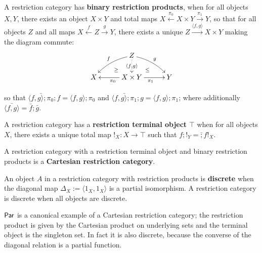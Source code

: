 \begin{definition}\cite{restiii}
A restriction category has {\bf binary restriction products}, when for all objects  $X,Y$, there exists an object $X\times Y$ and total maps $X \xleftarrow{\pi_0}  X\times Y \xrightarrow{\pi_1} Y$, so that for all objects $Z$ and all maps $X \xleftarrow{f} Z \xrightarrow{g} Y$, there exists a unique $Z\xrightarrow{\langle f,g \rangle} X\times Y$ making the diagram commute:
$$
\xymatrixrowsep{0.2cm}
\xymatrixcolsep{0.4cm}
\xymatrix{
&& Z\ar@{..>}[dd]|-{\langle f, g\rangle} \ar@/_/[ddll]_f \ar@/^/[ddrr]^g &&\\
& \ar@{}[dr]|-{\geq} && \ar@{}[dl] |-{\leq} &\\
X &&  X\times Y \ar[rr]_{\pi_1} \ar[ll]^{\pi_0}  && Y
}
$$

so that $\bar{\langle f, g\rangle ;\pi_0}; f = \langle f, g\rangle ;\pi_0$ and $\bar{\langle f, g\rangle; \pi_1} ;g = \langle f, g\rangle; \pi_1$;
where additionally $\bar{\langle f, g\rangle} =  \bar f ; \bar g$.


A restriction category has a {\bf restriction terminal object} $\top$ when for all objects $X$, there exists a unique total map $!_X:X\to\top$ such that $f ; !_Y = \bar ;  f !_X$.

A restriction category with a restriction terminal object and binary restriction products is a {\bf Cartesian restriction category}.


An object $A$ in a restriction category with restriction products is {\bf discrete} when the diagonal map $\Delta_X:=\langle 1_X, 1_X\rangle$ is a partial isomorphism. A restriction category is discrete when all objects are discrete. 
\end{definition}



$\mathsf{Par}$ is a canonical example of a Cartesian restriction category; the restriction product is given by the Cartesian product on underlying sets and the terminal object is  the singleton set. In fact it is also discrete, because the converse of the diagonal relation is a partial function.




